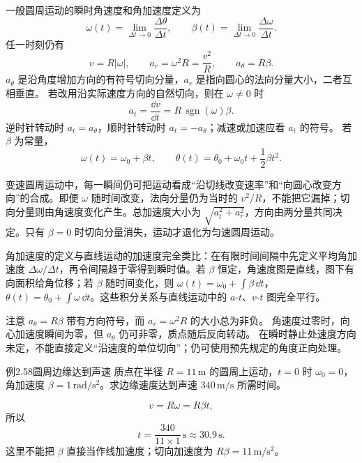 一般圆周运动的瞬时角速度和角加速度定义为
\begin{equation}
 \omega(t)=\lim_{\Delta t\to0}\frac{\Delta\theta}{\Delta t},
 \qquad
 \beta(t)=\lim_{\Delta t\to0}\frac{\Delta\omega}{\Delta t}.
\end{equation}
任一时刻仍有
\begin{equation}
 v=R|\omega|,\qquad a_r=\omega^2R=\frac{v^2}{R},
 \qquad a_\theta=R\beta.
\end{equation}
$a_\theta$ 是沿角度增加方向的有符号切向分量，$a_r$ 是指向圆心的法向分量大小，二者互相垂直。
若改用沿实际速度方向的自然切向，则在 $\omega\ne0$ 时
\[
 a_t=\frac{\dd v}{\dd t}=R\,\operatorname{sgn}(\omega)\beta.
\]
逆时针转动时 $a_t=a_\theta$，顺时针转动时 $a_t=-a_\theta$；减速或加速应看 $a_t$ 的符号。
若 $\beta$ 为常量，
\begin{equation}
 \omega(t)=\omega_0+\beta t,\qquad
 \theta(t)=\theta_0+\omega_0t+\frac12\beta t^2.
\end{equation}

变速圆周运动中，每一瞬间仍可把运动看成“沿切线改变速率”和“向圆心改变方向”的合成。即便 $\omega$ 随时间改变，法向分量仍为当时的 $v^2/R$，不能把它漏掉；切向分量则由角速度变化产生。总加速度大小为 $\sqrt{a_t^2+a_r^2}$，方向由两分量共同决定。只有 $\beta=0$ 时切向分量消失，运动才退化为匀速圆周运动。

角加速度的定义与直线运动的加速度完全类比：在有限时间间隔中先定义平均角加速度 $\Delta\omega/\Delta t$，再令间隔趋于零得到瞬时值。若 $\beta$ 恒定，角速度图是直线，图下有向面积给角位移；若 $\beta$ 随时间变化，则 $\omega(t)=\omega_0+\int\beta\,\dd t$，$\theta(t)=\theta_0+\int\omega\,\dd t$。这些积分关系与直线运动中的 $a$-$t$、$v$-$t$ 图完全平行。

注意 $a_\theta=R\beta$ 带有方向符号，而 $a_r=\omega^2R$ 的大小总为非负。
角速度过零时，向心加速度瞬间为零，但 $a_\theta$ 仍可非零，质点随后反向转动。
在瞬时静止处速度方向未定，不能直接定义“沿速度的单位切向”；仍可使用预先规定的角度正向处理。

\begin{origexamplebox}{例2.58\quad 圆周边缘达到声速}
质点在半径 $R=11\,\mathrm m$ 的圆周上运动，$t=0$ 时 $\omega_0=0$，角加速度 $\beta=1\,\mathrm{rad/s^2}$。求边缘速度达到声速 $340\,\mathrm{m/s}$ 所需时间。
\end{origexamplebox}
\begin{xesolution}
\[
v=R\omega=R\beta t,
\]
所以
\[
 \boxed{t=\frac{340}{11\times1}\,\mathrm s\approx30.9\,\mathrm s}.
\]
这里不能把 $\beta$ 直接当作线加速度；切向加速度为 $R\beta=11\,\mathrm{m/s^2}$。
\end{xesolution}

